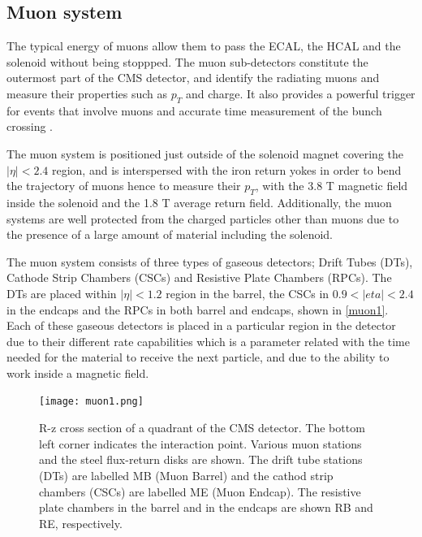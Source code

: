 \subsection{Muon system}

The typical energy of muons allow them to pass the ECAL, the HCAL and the solenoid without being stoppped. The muon sub-detectors constitute the outermost part of the CMS detector, and identify the radiating muons and measure their properties such as $p_T$ and charge. It also provides a powerful trigger for events that involve muons and accurate time measurement of the bunch crossing \cite{Layter:343814}.

The muon system is positioned just outside of the solenoid magnet covering the $|\eta| < 2.4$ region, and is interspersed with the iron return yokes in order to bend the trajectory of muons hence to measure their $p_T$, with the 3.8 T magnetic field inside the solenoid and the 1.8 T average return field. Additionally, the muon systems are well protected from the charged particles other than muons due to the presence of a large amount of material including the solenoid.

The  muon system consists of three types of gaseous detectors; Drift Tubes (DTs), Cathode Strip Chambers (CSCs) and Resistive Plate Chambers (RPCs). The DTs are placed within $|\eta| < 1.2$ region in the barrel, the CSCs in $0.9<|eta|<2.4$ in the endcaps and the RPCs in both barrel and endcaps, shown in \autoref{muon1}. Each of these gaseous detectors is placed in a particular region in the detector due to their different rate capabilities which is a parameter related with the time needed for the material to receive the next particle, and due to the ability to work inside a magnetic field.

\begin{figure}[ht]
	\centering
	\texttt{[image: muon1.png]}
	\vspace{2mm}
	\caption[R-z cross section of a quadrant of the CMS detector. The bottom left corner indicates the interaction point. Various muon stations and the steel flux-return disks are shown. The drift tube stations (DTs) are labelled MB (Muon Barrel) and the cathod strip chambers (CSCs) are labelled ME (Muon Endcap). The resistive plate chambers in the barrel and in the endcaps are shown RB and RE, respectively.]{R-z cross section of a quadrant of the CMS detector. The bottom left corner indicates the interaction point. Various muon stations and the steel flux-return disks are shown. The drift tube stations (DTs) are labelled MB (Muon Barrel) and the cathod strip chambers (CSCs) are labelled ME (Muon Endcap). The resistive plate chambers in the barrel and in the endcaps are shown RB and RE, respectively\cite{muon1}.}
	\label{muon1}
\end{figure}

